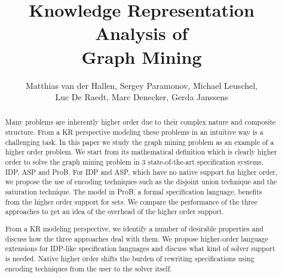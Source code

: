 \documentclass{new_tlp}
\author[]{Matthias van der Hallen, Sergey Paramonov, Michael Leuschel,\\ Luc De Raedt, Marc Denecker, Gerda Janssens}
\title{Knowledge Representation Analysis of\\ Graph Mining}
\begin{document}
\maketitle
\begin{abstract}
Many problems are inherently higher order due to their complex nature and composite structure.
From a KR perspective modeling these problems in an intu\"itive way is a challenging task.
In this paper we study the graph mining problem as an example of a higher order problem.
We start from its mathematical definition which is clearly higher
order to solve the graph mining problem in 3 state-of-the-art specification
systems, IDP, ASP and ProB.
For IDP and ASP, which have no
native support for higher order, we propose the use of encoding
techniques such as the disjoint union technique and the saturation technique.
The model in ProB, a formal specification language, benefits
from the higher order support for sets.
We compare the performance of the three approaches to get an idea of
the overhead of the higher order support.

From a KR modeling perspective, we identify a number of desirable
properties and discuss how the three approaches deal with them.
We propose higher-order language extensions for IDP-like
specification languages
and  discuss what kind of solver support is needed.
Native higher order shifts the burden of rewriting specifications using encoding techniques from the user to the solver itself.


\end{abstract}
\end{document}
